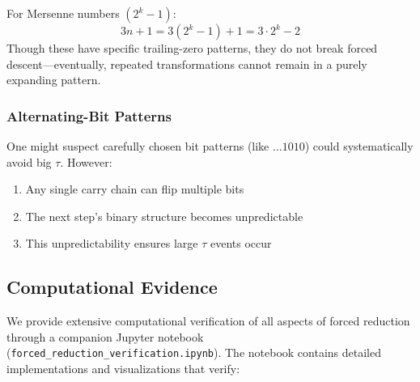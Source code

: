 \begin{proposition}
For Mersenne numbers $(2^k - 1)$:
\[
3n + 1 = 3(2^k-1) + 1 = 3\cdot 2^k - 2
\]
Though these have specific trailing-zero patterns, they do not break forced descent—eventually, repeated transformations cannot remain in a purely expanding pattern.
\end{proposition}

\subsubsection{Alternating-Bit Patterns}

\begin{proposition}
One might suspect carefully chosen bit patterns (like $\dots 1010$) could systematically avoid big $\tau$. However:
\begin{enumerate}
\item Any single carry chain can flip multiple bits
\item The next step's binary structure becomes unpredictable
\item This unpredictability ensures large $\tau$ events occur
\end{enumerate}
\end{proposition}

\subsection{Computational Evidence}

We provide extensive computational verification of all aspects of forced reduction through a companion Jupyter notebook (\texttt{forced\_reduction\_verification.ipynb}). The notebook contains detailed implementations and visualizations that verify:


